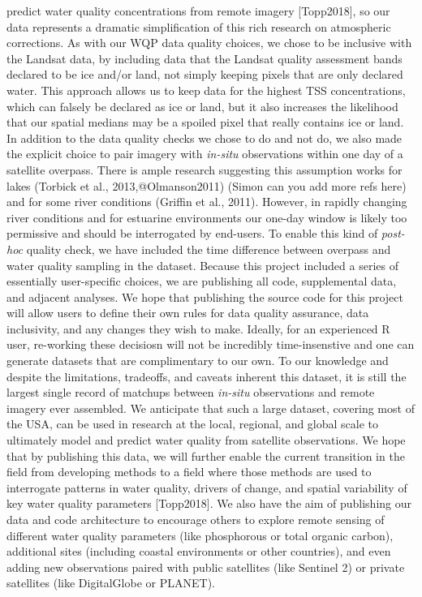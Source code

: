 \documentclass[]{article}
\begin{document}
predict water quality concentrations from remote imagery {[}Topp2018{]},
so our data represents a dramatic simplification of this rich research
on atmospheric corrections. As with our WQP data quality choices, we
chose to be inclusive with the Landsat data, by including data that the
Landsat quality assessment bands declared to be ice and/or land, not
simply keeping pixels that are only declared water. This approach allows
us to keep data for the highest TSS concentrations, which can falsely be
declared as ice or land, but it also increases the likelihood that our
spatial medians may be a spoiled pixel that really contains ice or land.
In addition to the data quality checks we chose to do and not do, we
also made the explicit choice to pair imagery with \emph{in-situ}
observations within one day of a satellite overpass. There is ample
research suggesting this assumption works for lakes (Torbick et al.,
2013,@Olmanson2011) (Simon can you add more refs here) and for some
river conditions (Griffin et al., 2011). However, in rapidly changing
river conditions and for estuarine environments our one-day window is
likely too permissive and should be interrogated by end-users. To enable
this kind of \emph{post-hoc} quality check, we have included the time
difference between overpass and water quality sampling in the dataset.
Because this project included a series of essentially user-specific
choices, we are publishing all code, supplemental data, and adjacent
analyses. We hope that publishing the source code for this project will
allow users to define their own rules for data quality assurance, data
inclusivity, and any changes they wish to make. Ideally, for an
experienced R user, re-working these decisiosn will not be incredibly
time-insenstive and one can generate datasets that are complimentary to
our own. To our knowledge and despite the limitations, tradeoffs, and
caveats inherent this dataset, it is still the largest single record of
matchups between \emph{in-situ} observations and remote imagery ever
assembled. We anticipate that such a large dataset, covering most of the
USA, can be used in research at the local, regional, and global scale to
ultimately model and predict water quality from satellite observations.
We hope that by publishing this data, we will further enable the current
transition in the field from developing methods to a field where those
methods are used to interrogate patterns in water quality, drivers of
change, and spatial variability of key water quality parameters
{[}Topp2018{]}. We also have the aim of publishing our data and code
architecture to encourage others to explore remote sensing of different
water quality parameters (like phosphorous or total organic carbon),
additional sites (including coastal environments or other countries),
and even adding new observations paired with public satellites (like
Sentinel 2) or private satellites (like DigitalGlobe or PLANET).
\end{document}
